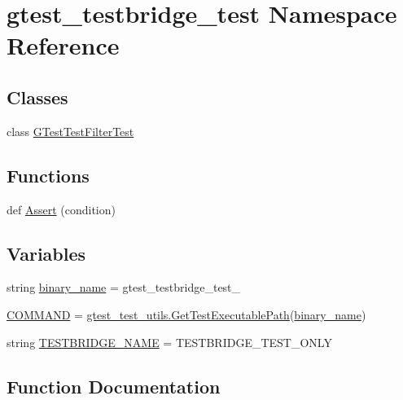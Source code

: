 \hypertarget{namespacegtest__testbridge__test}{}\section{gtest\+\_\+testbridge\+\_\+test Namespace Reference}
\label{namespacegtest__testbridge__test}
\subsection*{Classes}
\begin{DoxyCompactItemize}
\item 
class \mbox{\hyperlink{classgtest__testbridge__test_1_1GTestTestFilterTest}{G\+Test\+Test\+Filter\+Test}}
\end{DoxyCompactItemize}
\subsection*{Functions}
\begin{DoxyCompactItemize}
\item 
def \mbox{\hyperlink{namespacegtest__testbridge__test_a4cadaae26d75cafe8979fb17059b928e}{Assert}} (condition)
\end{DoxyCompactItemize}
\subsection*{Variables}
\begin{DoxyCompactItemize}
\item 
string \mbox{\hyperlink{namespacegtest__testbridge__test_a977d1efd7bcefffc40c3180756a22b54}{binary\+\_\+name}} = \textquotesingle{}gtest\+\_\+testbridge\+\_\+test\+\_\+\textquotesingle{}
\item 
\mbox{\hyperlink{namespacegtest__testbridge__test_a877e21091a8b1b2c70f8741279592c4a}{C\+O\+M\+M\+A\+ND}} = \mbox{\hyperlink{namespacegtest__test__utils_a89ed3717984a80ffbb7a9c92f71b86a2}{gtest\+\_\+test\+\_\+utils.\+Get\+Test\+Executable\+Path}}(\mbox{\hyperlink{namespacegtest__testbridge__test_a977d1efd7bcefffc40c3180756a22b54}{binary\+\_\+name}})
\item 
string \mbox{\hyperlink{namespacegtest__testbridge__test_a33605c2f318125cd970d016043c05d8f}{T\+E\+S\+T\+B\+R\+I\+D\+G\+E\+\_\+\+N\+A\+ME}} = \textquotesingle{}T\+E\+S\+T\+B\+R\+I\+D\+G\+E\+\_\+\+T\+E\+S\+T\+\_\+\+O\+N\+LY\textquotesingle{}
\end{DoxyCompactItemize}


\subsection{Function Documentation}
\mbox{\label{namespacegtest__testbridge__test_a4cadaae26d75cafe8979fb17059b928e}} 
